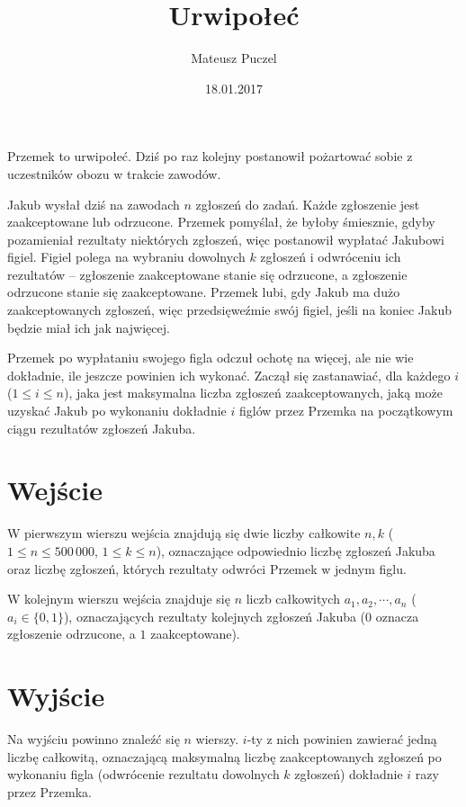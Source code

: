\documentclass[zad,zawodnik,utf8]{sinol}
\title{Urwipołeć}
\author{Mateusz Puczel} %
\date{18.01.2017}
\begin{document}
\begin{tasktext}%

Przemek to urwipołeć. Dziś po raz kolejny postanowił pożartować sobie z uczestników obozu w trakcie zawodów.

Jakub wysłał dziś na zawodach $n$ zgłoszeń do zadań. Każde zgłoszenie jest zaakceptowane lub odrzucone. Przemek pomyślał, że byłoby śmiesznie,
gdyby pozamieniał rezultaty niektórych zgłoszeń, więc postanowił wypłatać Jakubowi figiel.
Figiel polega na wybraniu dowolnych $k$ zgłoszeń i odwróceniu ich rezultatów -- zgłoszenie zaakceptowane
stanie się odrzucone, a zgłoszenie odrzucone stanie się zaakceptowane. Przemek lubi, gdy Jakub ma dużo zaakceptowanych zgłoszeń, więc
przedsięweźmie swój figiel, jeśli na koniec Jakub będzie miał ich jak najwięcej.

Przemek po wypłataniu swojego figla odczuł ochotę na więcej, ale nie wie dokładnie, ile jeszcze powinien ich wykonać.
Zaczął się zastanawiać, dla każdego $i$ ($1 \leq i \leq n$), jaka jest maksymalna liczba zgłoszeń zaakceptowanych, jaką może uzyskać
Jakub po wykonaniu dokładnie $i$ figlów przez Przemka na początkowym ciągu rezultatów zgłoszeń Jakuba.

  \section{Wejście}
W pierwszym wierszu wejścia znajdują się dwie liczby całkowite $n, k$ ($1 \leq n \leq 500\,000$, $1 \leq k \leq n$), oznaczające odpowiednio
liczbę zgłoszeń Jakuba oraz liczbę zgłoszeń, których rezultaty odwróci Przemek w jednym figlu.

W kolejnym wierszu wejścia znajduje się $n$ liczb całkowitych $a_1, a_2, \cdots, a_n$ ($a_i \in \{0, 1\}$), oznaczających
rezultaty kolejnych zgłoszeń Jakuba ($0$ oznacza zgłoszenie odrzucone, a $1$ zaakceptowane).

  \section{Wyjście}
Na wyjściu powinno znaleźć się $n$ wierszy. $i$-ty z nich powinien zawierać jedną liczbę całkowitą, oznaczającą maksymalną liczbę zaakceptowanych zgłoszeń
po wykonaniu figla (odwrócenie rezultatu dowolnych $k$ zgłoszeń) dokładnie $i$ razy przez Przemka.
  
\makecompactexample

\end{tasktext}
\end{document}
